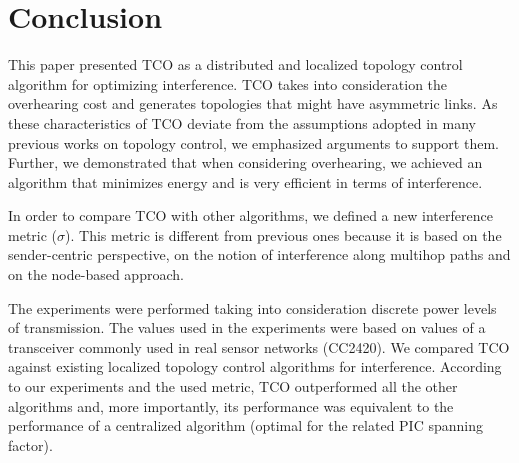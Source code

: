 \documentclass{llncs}
\begin{document}
\section{Conclusion}
\label{sec-conclusion}

This paper presented TCO as a distributed and localized topology control algorithm for optimizing interference. TCO takes into consideration
the overhearing cost and generates topologies that might have asymmetric links. As these characteristics of TCO deviate from the assumptions adopted in
many previous works on topology control, we emphasized arguments to support them. 
Further, we demonstrated that when considering overhearing, 
we achieved an algorithm that minimizes energy and is very efficient in terms of interference.

In order to compare TCO with other algorithms, we defined a new interference metric ($\sigma$).
This metric is different from previous ones because it is based on the sender-centric perspective, on the notion of interference along multihop paths and 
on the node-based approach.

The experiments were performed taking into consideration discrete power levels of transmission. The values used in the experiments were based on values
of a transceiver commonly used in real sensor networks (CC2420). We compared TCO against existing localized topology
control algorithms for interference. According to our experiments and the used metric, TCO outperformed 
all the other algorithms and, more importantly, its performance was equivalent to the performance of a centralized algorithm (optimal for the related
PIC spanning factor).



\end{document}
